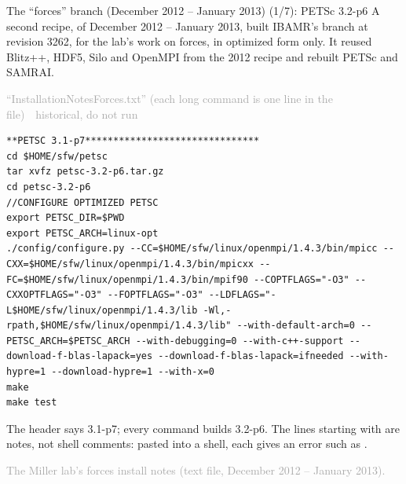 \documentclass[aspectratio=169,11pt]{beamer}
\newcommand{\sourcecredit}[1]{\vfill\begin{flushright}\tiny\textcolor{DarkGray}{#1}\end{flushright}}
\newcommand{\hist}[1]{{\tiny\sffamily\textcolor{DarkGray}{#1\ \textbullet\ historical, do not run}}\par\nointerlineskip\vspace{0.3mm}}
\begin{document}
\begin{frame}[fragile]{The ``forces'' branch (December 2012 -- January 2013) (1/7): PETSc 3.2-p6}
\label{fr:forces1}
\small A second recipe, of December 2012 -- January 2013, built IBAMR's  branch at revision 3262, for the lab's work on forces, in optimized form only. It reused Blitz++, HDF5, Silo and OpenMPI from the 2012 recipe and rebuilt PETSc and SAMRAI.

\vspace{1mm}
\hist{``InstallationNotesForces.txt'' (each long command is one line in the file)}
\begin{lstlisting}[style=hist]
**PETSC 3.1-p7*******************************
cd $HOME/sfw/petsc
tar xvfz petsc-3.2-p6.tar.gz
cd petsc-3.2-p6
//CONFIGURE OPTIMIZED PETSC
export PETSC_DIR=$PWD
export PETSC_ARCH=linux-opt
./config/configure.py --CC=$HOME/sfw/linux/openmpi/1.4.3/bin/mpicc --CXX=$HOME/sfw/linux/openmpi/1.4.3/bin/mpicxx --FC=$HOME/sfw/linux/openmpi/1.4.3/bin/mpif90 --COPTFLAGS="-O3" --CXXOPTFLAGS="-O3" --FOPTFLAGS="-O3" --LDFLAGS="-L$HOME/sfw/linux/openmpi/1.4.3/lib -Wl,-rpath,$HOME/sfw/linux/openmpi/1.4.3/lib" --with-default-arch=0 --PETSC_ARCH=$PETSC_ARCH --with-debugging=0 --with-c++-support --download-f-blas-lapack=yes --download-f-blas-lapack=ifneeded --with-hypre=1 --download-hypre=1 --with-x=0
make
make test
\end{lstlisting}
\footnotesize The header says 3.1-p7; every command builds 3.2-p6. The lines starting with \code{//} are notes, not shell comments: pasted into a shell, each gives an error such as .
\sourcecredit{The Miller lab's forces install notes (text file, December 2012 -- January 2013).}
\end{frame}
\end{document}
